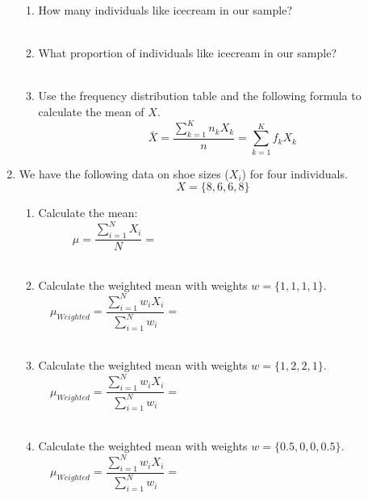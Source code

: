 \documentclass{./../handout}
\begin{document}
\begin{enumerate}
\begin{enumerate}
\item How many individuals like icecream in our sample? \\~\\
\item What proportion of individuals like icecream in our sample? \\~\\
\item Use the frequency distribution table and the following formula to calculate the mean of $X$. 
$$ \bar{X} = \frac{\sum_{k=1}^K n_k X_k}{n} = \sum_{k=1}^K f_k X_k $$
\end{enumerate}

\newpage
\item We have the following data on shoe sizes ($X_i$) for four individuals. 
$$ X = \{8, 6, 6, 8 \}$$
\begin{enumerate}
\item Calculate the mean:
$$ \mu = \frac {\sum_{i=1}^N X_i}{N} = \hspace{8cm} $$ \\
\item Calculate the weighted mean with weights $ w=  \{1, 1, 1, 1 \}$.
$$ \mu_{Weighted} = \frac {\sum_{i=1}^N w_i X_i}{\sum_{i=1}^N w_i } = \hspace{8cm} $$ \\
\item Calculate the weighted mean with weights $ w=  \{1, 2, 2, 1 \}$.
$$ \mu_{Weighted} = \frac {\sum_{i=1}^N w_i X_i}{\sum_{i=1}^N w_i } = \hspace{8cm} $$ \\
\item Calculate the weighted mean with weights $ w=  \{0.5, 0, 0, 0.5 \}$.
$$ \mu_{Weighted} = \frac {\sum_{i=1}^N w_i X_i}{\sum_{i=1}^N w_i } = \hspace{8cm} $$ 
\end{enumerate}
\vspace{4em}
\end{enumerate}
\end{document}
